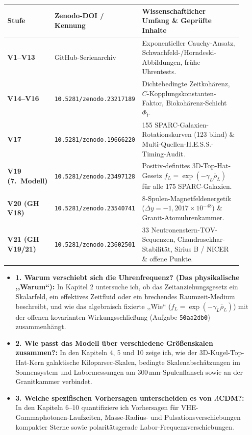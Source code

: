 \documentclass[10pt,a4paper]{article}
\begin{document}
{\vspace{0.5mm}
\begin{center}\vspace{-2pt}
{\footnotesize
\begin{tabular}{@{}>{\bfseries}p{0.15\linewidth}p{0.27\linewidth}p{0.53\linewidth}@{}}
\toprule
Stufe & Zenodo-DOI / Kennung & Wissenschaftlicher Umfang \& Gepr\"ufte Inhalte \\
\midrule
V1--V13 & GitHub-Serienarchiv & Exponentieller Cauchy-Ansatz, Schwachfeld-/Horndeski-Abbildungen, fr\"uhe Uhrentests. \\
V14--V16 & \texttt{10.5281/zenodo.23217189} & Dichtebedingte Zeitkoh\"arenz, $C$-Kopplungskonstanten-Faktor, Biokoh\"arenz-Schicht $\Phi_t$. \\
V17 & \texttt{10.5281/zenodo.19666220} & 155 SPARC-Galaxien-Rotationskurven (123 blind) \& Multi-Quellen-H.E.S.S.-Timing-Audit. \\
V19 (7.\ Modell) & \texttt{10.5281/zenodo.23497128} & Positiv-definites 3D-Top-Hat-Gesetz $f_L=\exp(-\gamma_L\bar{\rho}_L)$ f\"ur alle 175 SPARC-Galaxien. \\
V20 (GH V18) & \texttt{10.5281/zenodo.23540741} & 8-Spulen-Magnetfeldenergetik ($\Delta y=-1{,}2017\times 10^{-48}$) \& Granit-Atomuhrenkammer. \\
V21 (GH V19/21) & \texttt{10.5281/zenodo.23602501} & 33 Neutronenstern-TOV-Sequenzen, Chandrasekhar-Stabilit\"at, Sirius B / NICER \& offene Punkte. \\
\bottomrule
\end{tabular}}
\end{center}

\vspace{1mm}
\begin{itemize}\setlength{\itemsep}{1.5pt}\setlength{\parskip}{0pt}\setlength{\topsep}{1pt}
  \item \textbf{1. Warum verschiebt sich die Uhrenfrequenz? (Das physikalische ,,Warum``):} In Kapitel 2 untersuche ich, ob das Zeitanziehungsgesetz ein Skalarfeld, ein effektives Zeitfluid oder ein brechendes Raumzeit-Medium beschreibt, und wie das algebraisch fixierte ,,Wie`` ($f_L = \exp(-\gamma_L \bar{\rho}_L)$) mit der offenen kovarianten Wirkungsschlie\ss ung (Aufgabe \texttt{50aa2db0}) zusammenh\"angt.
  \item \textbf{2. Wie passt das Modell \"uber verschiedene Gr\"o\ss enskalen zusammen?:} In den Kapiteln 4, 5 und 10 zeige ich, wie der 3D-Kugel-Top-Hat-Kern galaktische Kiloparsec-Skalen, bedingte Skalenabsch\"atzungen im Sonnensystem und Labormessungen am $300\,\text{mm}$-Spulenflansch sowie an der Granitkammer verbindet.
  \item \textbf{3. Welche spezifischen Vorhersagen unterscheiden es von $\Lambda$CDM?:} In den Kapiteln 6--10 quantifiziere ich Vorhersagen f\"ur VHE-Gammaphotonen-Laufzeiten, Masse-Radius- und Pulsationsverschiebungen kompakter Sterne sowie polarit\"atsgerade Labor-Frequenzverschiebungen.
\end{itemize}
}\vfill
\end{document}
